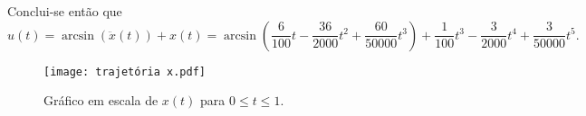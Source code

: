 	Conclui-se então que
	\[
		u(t) = \arcsin(\ddot{x}(t)) + x(t)
		     = \arcsin\left(
		     	   \frac{6}{100}t - \frac{36}{2000}t^2 + \frac{60}{50000}t^3 
		       \right)
		       +
		       \frac{1}{100}t^3 - \frac{3}{2000}t^4 +\frac{3}{50000}t^5.
	\]
	\begin{figure}[H]\centering
		\texttt{[image: trajetória x.pdf]}
		\caption{Gráfico em escala de $x(t)$ para $0\leq t\leq1$.}
	\end{figure}


